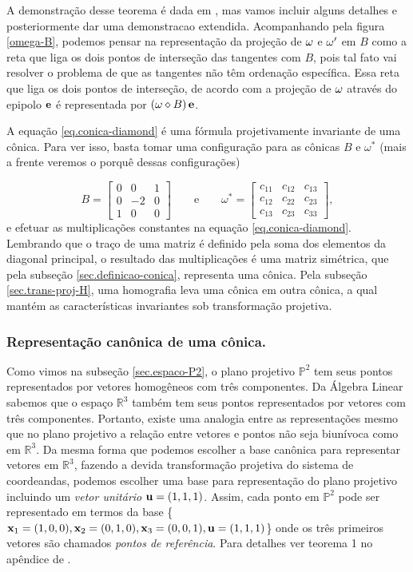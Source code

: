 A demonstração desse teorema é dada em \cite{2503343}, mas vamos incluir alguns detalhes e posteriormente dar uma demonstracao extendida. Acompanhando pela figura \ref{omega-B}, podemos pensar na representação da projeção de  ${\bf \omega}$ e ${\bf \omega'}$ em $B$ como a reta que liga os dois pontos de interseção das tangentes com $B$, pois tal fato vai resolver o problema de que as tangentes não têm ordenação específica. Essa reta que liga os dois pontos de interseção, de acordo com a projeção de ${\bf \omega}$ através do epipolo ${\bf e}$ é representada por $({\bf \omega}\diamond B)\,{\bf e}$.

A equação \ref{eq.conica-diamond} é uma fórmula projetivamente invariante de uma cônica. Para ver isso, basta tomar uma configuração para as cônicas $B$ e $\omega^*$ (mais a frente veremos o porquê dessas configurações)

\begin{equation*}
B=
\begin{bmatrix}
0&0&1\\
0&-2&0\\
1&0&0
\end{bmatrix}
\qquad\text{e}\qquad
\omega^*=
\begin{bmatrix}
c_{11}&c_{12}&c_{13}\\
c_{12}&c_{22}&c_{23}\\
c_{13}&c_{23}&c_{33}
\end{bmatrix},
\end{equation*} 
e efetuar as multiplicações constantes na equação \ref{eq.conica-diamond}. Lembrando que o traço de uma matriz é definido pela soma dos elementos da diagonal principal, o resultado das multiplicações é uma matriz simétrica, que pela subseção \ref{sec.definicao-conica}, representa uma cônica. Pela subseção \ref{sec.trans-proj-H}, uma homografia leva uma cônica em outra cônica, a qual mantém as características invariantes sob transformação projetiva.

\subsubsection{Representação canônica de uma cônica.}\label{sec.forma-canonica-B}

Como vimos na subseção \ref{sec.espaco-P2}, o plano projetivo $\mathbb{P}^2$ tem seus pontos representados por vetores homogêneos com três componentes. Da Álgebra Linear sabemos que o espaço $\mathbb{R}^3$ também tem seus pontos representados por vetores com três componentes. Portanto, existe uma analogia entre as representações mesmo que no plano projetivo a relação entre vetores e pontos não seja biunívoca como em $\mathbb{R}^3$. Da mesma forma que podemos escolher a base canônica para representar vetores em $\mathbb{R}^3$, fazendo a devida transformação projetiva do sistema de coordeandas, podemos escolher uma base para representação do plano projetivo incluindo um \textit{vetor unitário} ${\bf u}=(1,1,1)$. Assim, cada ponto em $\mathbb{P}^2$ pode ser representado em termos da base \{$\mathbf{x}_1=(1,0,0),\mathbf{x}_2=(0,1,0),\mathbf{x}_3=(0,0,1),{\bf u}=(1,1,1)$\} onde os três primeiros vetores são chamados {\it pontos de referência}. Para detalhes ver teorema 1 no apêndice  de \citep{kneebone}.

